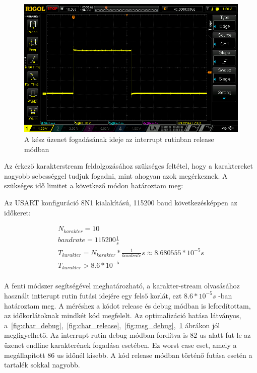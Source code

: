 \begin{figure}
  \centering \includegraphics[width=150mm,
    keepaspectratio]{figures/ch3/osc_complete_message_release.png}
  \caption{A kész üzenet fogadásának ideje az interrupt rutinban release módban}
  \label{fig:msg_release}
\end{figure}

Az érkező karakterstream feldolgozásához szükséges feltétel, hogy a karaktereket
nagyobb sebességgel tudjuk fogadni, mint ahogyan azok megérkeznek. A szükséges
idő limitet a következő módon határoztam meg:

\medskip

Az USART konfiguráció 8N1 kialakítású, 115200 baud következésképpen az időkeret:

\begin{eqnarray*}
N_{karakter} = 10 \\
baudrate = 115200 \frac{1}{s} \\
T_{karakter} = N_{karakter} * \frac{1}{baudrate} s \approx 8.680555 * 10^{-5} s \\
T_{karakter} > 8.6 * 10^{-5} \\
\end{eqnarray*}

A fenti módszer segítségével meghatározható, a karakter-stream olvasásához
használt intterupt rutin futási idejére egy felső korlát, ezt $8.6 * 10^{-5}s$
-ban határoztam meg. A méréshez a kódot release és debug módban is lefordítottam,
az időkorlátoknak mindkét kód megfelelt. Az optimalizáció hatása látványos,
a~\ref{fig:char_debug},~\ref{fig:char_release},~\ref{fig:msg_debug},~\ref{fig:msg_release}
ábrákon jól megfigyelhető. Az interrupt rutin debug módban fordítva is 82 us
alatt fut le az üzenet endline karakterének fogadása esetében. Ez worst case
eset, amely a megállapított 86 us időnél kisebb. A kód release módban történő
futása esetén a tartalék sokkal nagyobb. 

